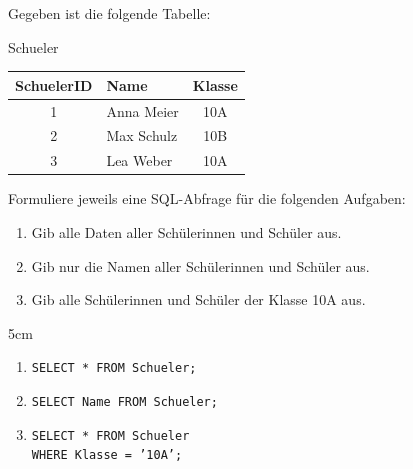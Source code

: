 \question[3]
Gegeben ist die folgende Tabelle:

Schueler  \medskip
 
\begin{tabular}{|c|l|c|}
\hline
SchuelerID & Name & Klasse \\
\hline
1 & Anna Meier & 10A \\
2 & Max Schulz & 10B \\
3 & Lea Weber & 10A \\
\hline
\end{tabular}


Formuliere jeweils eine SQL-Abfrage für die folgenden Aufgaben:

\begin{enumerate}
\item Gib alle Daten aller Schülerinnen und Schüler aus.
\item Gib nur die Namen aller Schülerinnen und Schüler aus.
\item Gib alle Schülerinnen und Schüler der Klasse 10A aus.
\end{enumerate}

\begin{solutionbox}{5cm}
\begin{enumerate}
\item
\texttt{SELECT * FROM Schueler;}

\item
\texttt{SELECT Name FROM Schueler;}

\item
\texttt{SELECT * FROM Schueler}\\
\texttt{WHERE Klasse = '10A';}
\end{enumerate}

\end{solutionbox}